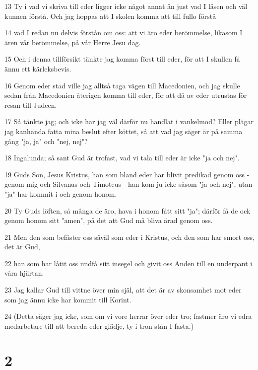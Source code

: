 \par 13 Ty i vad vi skriva till eder ligger icke något annat än just vad I läsen och väl kunnen förstå. Och jag hoppas att I skolen komma att till fullo förstå
\par 14 vad I redan nu delvis förstån om oss: att vi äro eder berömmelse, likasom I ären vår berömmelse, på vår Herre Jesu dag.
\par 15 Och i denna tillförsikt tänkte jag komma först till eder, för att I skullen få ännu ett kärleksbevis.
\par 16 Genom eder stad ville jag alltså taga vägen till Macedonien, och jag skulle sedan från Macedonien återigen komma till eder, för att då av eder utrustas för resan till Judeen.
\par 17 Så tänkte jag; och icke har jag väl därför nu handlat i vankelmod? Eller plägar jag kanhända fatta mina beslut efter köttet, så att vad jag säger är på samma gång "ja, ja" och "nej, nej"?
\par 18 Ingalunda; så sant Gud är trofast, vad vi tala till eder är icke "ja och nej".
\par 19 Guds Son, Jesus Kristus, han som bland eder har blivit predikad genom oss - genom mig och Silvanus och Timoteus - han kom ju icke såsom "ja och nej", utan "ja" har kommit i och genom honom.
\par 20 Ty Guds löften, så många de äro, hava i honom fått sitt "ja"; därför få de ock genom honom sitt "amen", på det att Gud må bliva ärad genom oss.
\par 21 Men den som befäster oss såväl som eder i Kristus, och den som har smort oss, det är Gud,
\par 22 han som har låtit oss undfå sitt insegel och givit oss Anden till en underpant i våra hjärtan.
\par 23 Jag kallar Gud till vittne över min själ, att det är av skonsamhet mot eder som jag ännu icke har kommit till Korint.
\par 24 (Detta säger jag icke, som om vi vore herrar över eder tro; fastmer äro vi edra medarbetare till att bereda eder glädje, ty i tron stån I fasta.)

\chapter{2}

